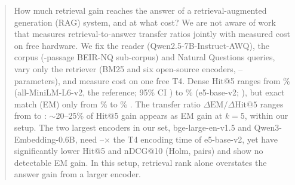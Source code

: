 \begin{abstract}
How much retrieval gain reaches the answer of a retrieval-augmented generation (RAG) system, and at what cost?
We are not aware of work that measures retrieval-to-answer transfer ratios jointly with measured cost on free hardware.
We fix the reader (Qwen2.5-7B-Instruct-AWQ), the corpus (-passage BEIR-NQ sub-corpus) and  Natural Questions queries, vary only the retriever (BM25 and six open-source encoders, -- parameters), and measure cost on one free T4.
Dense Hit@5 ranges from \% (all-MiniLM-L6-v2, the reference; 95\% CI ) to \% (e5-base-v2; ), but exact match (EM) only from \%  to \% .
The transfer ratio $\Delta\mathrm{EM}/\Delta\mathrm{Hit@5}$ ranges from   to  : $\sim$20--25\% of Hit@5 gain appears as EM gain at $k{=}5$, within our setup.
The two largest encoders in our set, bge-large-en-v1.5 and Qwen3-Embedding-0.6B, need --$\times$ the T4 encoding time of e5-base-v2, yet have significantly lower Hit@5 and nDCG@10 (Holm,  pairs) and show no detectable EM gain.
In this setup, retrieval rank alone overstates the answer gain from a larger encoder.
\end{abstract}
